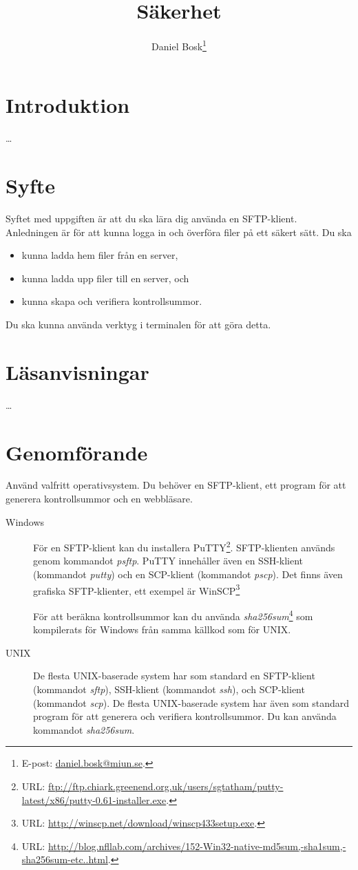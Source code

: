 \documentclass[11pt,a4paper]{miunasgn}
\title{Säkerhet}
\author{Daniel Bosk\footnote{%
	E-post: \href{mailto:daniel.bosk@miun.se}{daniel.bosk@miun.se}.
}}
\date{\svnId}
\begin{document}
\maketitle
\thispagestyle{foot}
\tableofcontents

\newtheorem{example}{Exempel}

\section{Introduktion}
\label{sec:Introduktion}
\noindent
\dots


\section{Syfte}
\label{sec:Syfte}
\noindent
Syftet med uppgiften är att du ska lära dig använda en SFTP-klient.
Anledningen är för att kunna logga in och överföra filer på ett säkert sätt.
Du ska
\begin{itemize}
    \item kunna ladda hem filer från en server,
    \item kunna ladda upp filer till en server, och
	\item kunna skapa och verifiera kontrollsummor.
\end{itemize}
Du ska kunna använda verktyg i terminalen för att göra detta.


\section{Läsanvisningar}
\label{sec:Lasanvisningar}
\noindent
\dots


\section{Genomförande}
\label{sec:Genomforande}
\noindent
Använd valfritt operativsystem.
Du behöver en SFTP-klient, ett program för att generera kontrollsummor och en
webbläsare.
\begin{description}
	\item[Windows] För en SFTP-klient kan du installera PuTTY\footnote{%
			URL: \url{ftp://ftp.chiark.greenend.org.uk/users/sgtatham/putty-latest/x86/putty-0.61-installer.exe}.
		}.
		SFTP-klienten används genom kommandot \emph{psftp}.
		PuTTY innehåller även en SSH-klient (kommandot \emph{putty}) och en
		SCP-klient (kommandot \emph{pscp}).
		Det finns även grafiska SFTP-klienter, ett exempel är WinSCP\footnote{%
			URL: \url{http://winscp.net/download/winscp433setup.exe}.
		}

		För att beräkna kontrollsummor kan du använda
		\emph{sha256sum}\footnote{%
			URL: \url{http://blog.nfllab.com/archives/152-Win32-native-md5sum,-sha1sum,-sha256sum-etc..html}.
		} som kompilerats för Windows från samma källkod som för UNIX.
	\item[UNIX] De flesta UNIX-baserade system har som standard en SFTP-klient
		(kommandot \emph{sftp}), SSH-klient (kommandot \emph{ssh}), och
		SCP-klient (kommandot \emph{scp}).
		De flesta UNIX-baserade system har även som standard program för att
		generera och verifiera kontrollsummor.
		Du kan använda kommandot \emph{sha256sum}.
\end{description}
\end{document}
